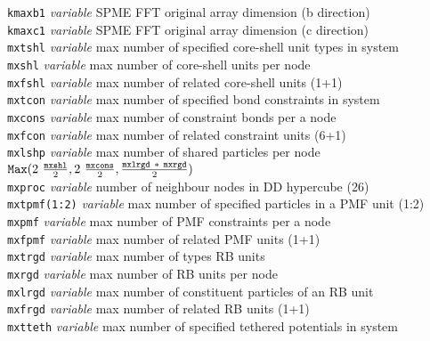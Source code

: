 \begin{tabbing}
\> {\tt kmaxb1}      \> {\em variable}       \> SPME FFT original array dimension (b direction) \\
\> {\tt kmaxc1}      \> {\em variable}       \> SPME FFT original array dimension (c direction) \\
\> {\tt mxtshl}      \> {\em variable}       \> max number of specified core-shell unit types in system \\
\> {\tt mxshl}       \> {\em variable}       \> max number of core-shell units per node \\
\> {\tt mxfshl}      \> {\em variable}       \> max number of related core-shell units (1+1) \\
\> {\tt mxtcon}      \> {\em variable}       \> max number of specified bond constraints in system \\
\> {\tt mxcons}      \> {\em variable}       \> max number of constraint bonds per a node \\
\> {\tt mxfcon}      \> {\em variable}       \> max number of related constraint units (6+1) \\
\> {\tt mxlshp}      \> {\em variable}       \> max number of shared particles per node \\
\>                   \>                      \> ${\tt Max} (2~\frac{\tt mxshl}{2},2~\frac{\tt mxcons}{2},\frac{{\tt mxlrgd}~*~{\tt mxrgd}}{2})$ \\
\> {\tt mxproc}      \> {\em variable}       \> number of neighbour nodes in DD hypercube (26) \\
\> {\tt mxtpmf(1:2)} \> {\em variable}       \> max number of specified particles in a PMF unit (1:2) \\
\> {\tt mxpmf}       \> {\em variable}       \> max number of PMF constraints per a node \\
\> {\tt mxfpmf}      \> {\em variable}       \> max number of related PMF units (1+1) \\
\> {\tt mxtrgd}      \> {\em variable}       \> max number of types RB units \\
\> {\tt mxrgd}       \> {\em variable}       \> max number of RB units per node \\
\> {\tt mxlrgd}      \> {\em variable}       \> max number of constituent particles of an RB unit \\
\> {\tt mxfrgd}      \> {\em variable}       \> max number of related RB units (1+1) \\
\> {\tt mxtteth}     \> {\em variable}       \> max number of specified tethered potentials in system \\

\end{tabbing}
